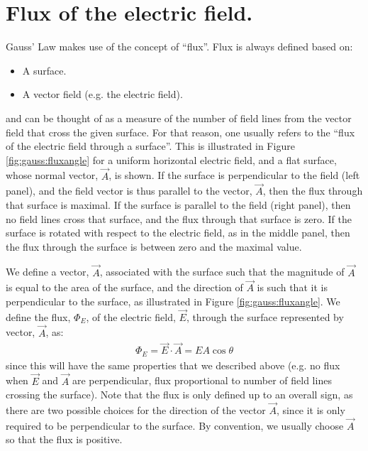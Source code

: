 \section{Flux of the electric field.}
\label{sec:gauss:flux}
Gauss' Law makes use of the concept of ``flux''. Flux is always defined based on:
\begin{itemize}
\item A surface.
\item A vector field (e.g. the electric field). 
\end{itemize}
and can be thought of as a measure of the number of field lines from the vector field that cross the given surface. For that reason, one usually refers to the ``flux of the electric field through a surface''. This is illustrated in Figure \ref{fig:gauss:fluxangle} for a uniform horizontal electric field, and a flat surface, whose normal vector, $\vec A$, is shown. If the surface is perpendicular to the field (left panel), and the field vector is thus parallel to the vector, $\vec A$, then the flux through that surface is maximal. If the surface is parallel to the field (right panel), then no field lines cross that surface, and the flux through that surface is zero. If the surface is rotated with respect to the electric field, as in the middle panel, then the flux through the surface is between zero and the maximal value.


We define a vector, $\vec A$, associated with the surface such that the magnitude of $\vec A$ is equal to the area of the surface, and the direction of $\vec A$ is such that it is perpendicular to the surface, as illustrated in Figure \ref{fig:gauss:fluxangle}. We define the flux, $\Phi_E$, of the electric field, $\vec E$, through the surface represented by vector, $\vec A$, as:
\begin{align*}
\Phi_E=\vec E\cdot \vec A=EA\cos\theta
\end{align*}
since this will have the same properties that we described above (e.g. no flux when $\vec E$ and $\vec A$ are perpendicular, flux proportional to number of field lines crossing the surface). Note that the flux is only defined up to an overall sign, as there are two possible choices for the direction of the vector $\vec A$, since it is only required to be perpendicular to the surface. By convention, we usually choose $\vec A$ so that the flux is positive.




